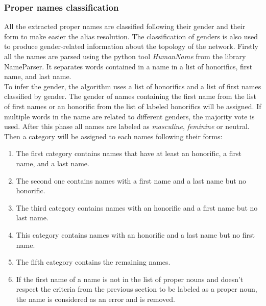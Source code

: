 \documentclass[a4paper, 12pt]{report}
\begin{document}
\subsubsection{Proper names classification}
\label{section:classification}
All the extracted proper names are classified following their gender and their form to make easier the alias resolution.
The classification of genders is also used to produce gender-related information about the topology of the network.
Firstly all the names are parsed using the python tool \textit{HumanName} from the library {NameParser}.
It separates words contained in a name in a list of honorifics, first name, and last name.\\

To infer the gender, the algorithm uses a list of honorifics and a list of first names classified by gender.
The gender of names containing the first name from the list of first names or an honorific from the list of labeled honorifics will be assigned.
If multiple words in the name are related to different genders, the majority vote is used.
After this phase all names are labeled as \textit{masculine}, \textit{feminine} or {neutral}.\\

Then a category will be assigned to each names following their forms:
\begin{enumerate}
\item The first category contains names that have at least an honorific, a first name, and a last name.
\item The second one contains names with a first name and a last name but no honorific.
\item The third category contains names with an honorific and a first name but no last name.
\item This category contains names with an honorific and a last name but no first name.
\item The fifth category contains the remaining names.
\item If the first name of a name is not in the list of proper nouns and doesn't respect the criteria from the previous section to be labeled as a proper noun,
the name is considered as an error and is removed.
\end{enumerate}
\end{document}

